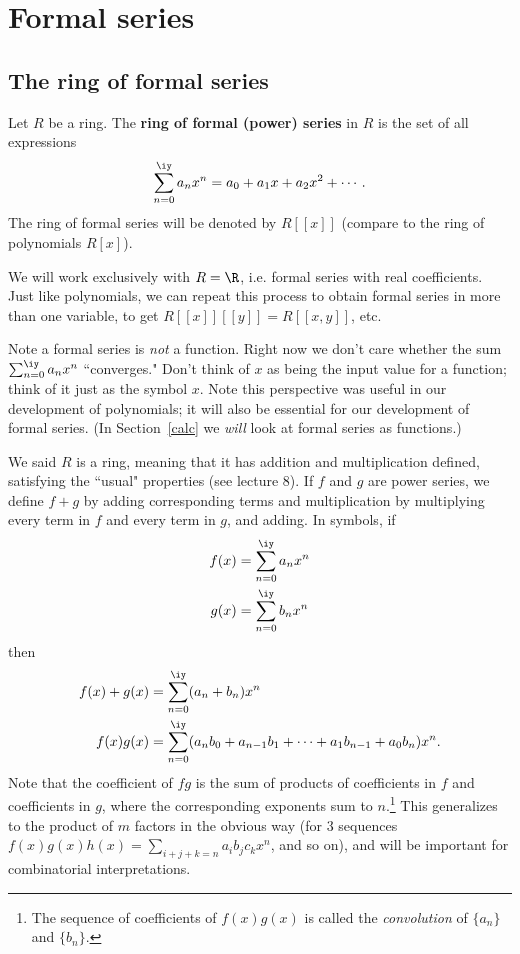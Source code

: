 \section{Formal series}\label{formal}
\subsection{The ring of formal series}
\begin{df}
Let $R$ be a ring. The \textbf{ring of formal (power) series} in $R$ is the set of all expressions
\[
\sum_{n=0}^{\iy} a_nx^n=a_0+a_1x+a_2x^2+\cdots.
\]
The ring of formal series will be denoted by $R[[x]]$ (compare to the ring of polynomials $R[x]$). 
\end{df}
We will work exclusively with $R=\R$, i.e. formal series with real coefficients. Just like polynomials, we can repeat this process to obtain formal series in more than one variable, to get $R[[x]][[y]]=R[[x,y]]$, etc.

Note a formal series is {\it not} a function. Right now we don't care whether the sum $\sum_{n=0}^{\iy} a_nx^n$ ``converges." Don't think of $x$ as being the input value for a function; think of it just as the symbol $x$. Note this perspective was useful in our development of polynomials; it will also be essential for our development of formal series. (In Section~\ref{calc} we {\it will} look at formal series as functions.)

We said $R$ is a ring, meaning that it has addition and multiplication defined, satisfying the ``usual" properties (see lecture 8). If $f$ and $g$ are power series, we define $f+g$ by adding corresponding terms and multiplication by multiplying every term in $f$ and every term in $g$, and adding. In symbols, if
\begin{align*}
f(x)&=\sum_{n=0}^{\iy} a_n x^n\\
g(x)&=\sum_{n=0}^{\iy} b_n x^n
\end{align*}
then
\begin{align}
\nonumber
f(x)+g(x)&=\sum_{n=0}^{\iy} (a_n+b_n)x^n\\
f(x)g(x)&=\sum_{n=0}^{\iy} (a_nb_0+a_{n-1}b_1+\cdots +a_1b_{n-1}+a_0b_n)x^n.\label{prod}
\end{align}
Note that the coefficient of $fg$ is the sum of products of coefficients in $f$ and coefficients in $g$, where the corresponding exponents sum to $n$.\footnote{The sequence of coefficients of $f(x)g(x)$ is called the {\it convolution} of $\{ a_n\}$ and $\{b_n\}$.} This generalizes to the product of $m$ factors in the obvious way (for 3 sequences $f(x)g(x)h(x)=\sum_{i+j+k=n} a_ib_jc_kx^n$, and so on), and will be important for combinatorial interpretations.

